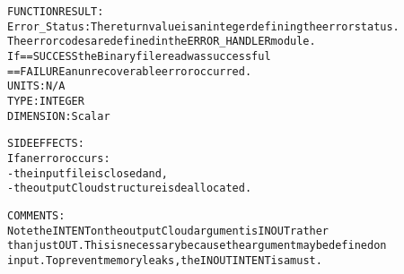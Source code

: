 \begin{alltt}
  FUNCTION RESULT:
        Error_Status:   The return value is an integer defining the error status.
                        The error codes are defined in the ERROR_HANDLER module.
                        If == SUCCESS the Binary file read was successful
                           == FAILURE an unrecoverable error occurred.
                        UNITS:      N/A
                        TYPE:       INTEGER
                        DIMENSION:  Scalar
 
  SIDE EFFECTS:
        If an error occurs:
        - the input file is closed and,
        - the output Cloud structure is deallocated.
 
  COMMENTS:
        Note the INTENT on the output Cloud argument is IN OUT rather
        than just OUT. This is necessary because the argument may be defined on
        input. To prevent memory leaks, the IN OUT INTENT is a must.
 
  \end{alltt}
